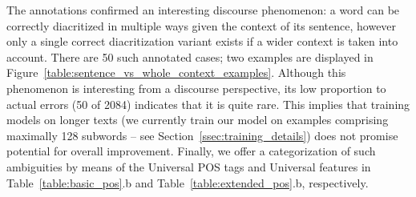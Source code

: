\documentclass{pbmlarxiv}
\begin{document}
The annotations confirmed an interesting discourse phenomenon: a word can be correctly diacritized in multiple ways given the context of its sentence, however only a single correct diacritization variant exists if a wider context is taken into account. There are 50 such annotated cases; two examples are displayed in Figure~\ref{table:sentence_vs_whole_context_examples}. Although this phenomenon is interesting from a discourse perspective, its low proportion to actual errors (50 of 2084) indicates that it is quite rare. This implies that training models on longer texts (we currently train our model on examples comprising maximally 128 subwords -- see Section~\ref{ssec:training_details}) does not promise potential for overall improvement. Finally, we offer a categorization of such ambiguities by means of the Universal POS tags and Universal features \cite{nivre-etal-2020-universal} in Table~\ref{table:basic_pos}.b and Table~\ref{table:extended_pos}.b, respectively.
\end{document}
